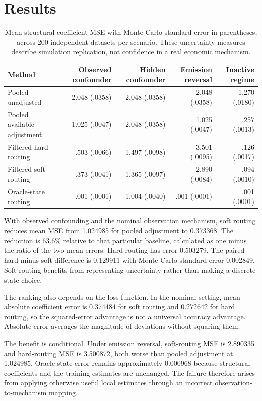 \section{Results}
\begin{table}[t]
\centering
\caption{Mean structural-coefficient MSE with Monte Carlo standard error in parentheses, across 200 independent datasets per scenario. These uncertainty measures describe simulation replication, not confidence in a real economic mechanism.}
\small
\setlength{\tabcolsep}{3pt}
\begin{tabular}{lrrrr}\toprule
Method & Observed confounder & Hidden confounder & Emission reversal & Inactive regime\\\midrule
Pooled unadjusted & 2.048 (.0358) & 2.048 (.0358) & 2.048 (.0358) & 1.270 (.0180)\\
Pooled available adjustment & 1.025 (.0047) & 2.048 (.0358) & 1.025 (.0047) & .257 (.0013)\\
Filtered hard routing & .503 (.0066) & 1.497 (.0098) & 3.501 (.0095) & .126 (.0017)\\
Filtered soft routing & .373 (.0041) & 1.365 (.0097) & 2.890 (.0084) & .094 (.0010)\\
Oracle-state routing & .001 (.0001) & 1.004 (.0040) & .001 (.0001) & .001 (.0001)\\\bottomrule
\end{tabular}\label{tab:cmtf}
\end{table}

With observed confounding and the nominal observation mechanism, soft routing reduces mean MSE from 1.024985 for pooled adjustment to 0.373368. The reduction is 63.6\% relative to that particular baseline, calculated as one minus the ratio of the two mean errors. Hard routing has error 0.503279. The paired hard-minus-soft difference is 0.129911 with Monte Carlo standard error 0.002849. Soft routing benefits from representing uncertainty rather than making a discrete state choice.

The ranking also depends on the loss function. In the nominal setting, mean absolute coefficient error is 0.374484 for soft routing and 0.272642 for hard routing, so the squared-error advantage is not a universal accuracy advantage. Absolute error averages the magnitude of deviations without squaring them.

The benefit is conditional. Under emission reversal, soft-routing MSE is 2.890335 and hard-routing MSE is 3.500872, both worse than pooled adjustment at 1.024985. Oracle-state error remains approximately 0.000968 because structural coefficients and the training estimates are unchanged. The failure therefore arises from applying otherwise useful local estimates through an incorrect observation-to-mechanism mapping.

